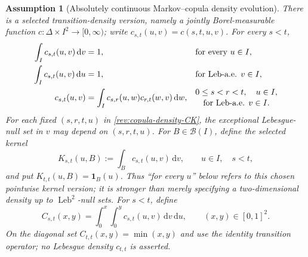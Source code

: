 \documentclass[11pt]{article}
\newtheorem{assumption}[definition]{Assumption}
\theoremstyle{remark}
\newcommand{\dd}{\,\mathrm d}
\newcommand{\one}{\mathbf 1}
\newcommand{\Leb}{\operatorname{Leb}}
\begin{document}
\begin{assumption}[Absolutely continuous Markov--copula density evolution]
\label{rev:ass-copula-density}
There is a \emph{selected transition-density version}, namely a jointly
Borel-measurable function
$c:\Delta\times I^2\to[0,\infty)$; write
$c_{s,t}(u,v)=c(s,t,u,v)$.  For every $s<t$,
\begin{align}
\int_I c_{s,t}(u,v)\dd v&=1,
&&\text{for every }u\in I,\notag\\
\int_I c_{s,t}(u,v)\dd u&=1,
&&\text{for $\Leb$-a.e. }v\in I,
\label{rev:copula-density-margins}\\
c_{s,t}(u,v)&=\int_Ic_{s,r}(u,w)c_{r,t}(w,v)\dd w,
&&\begin{gathered}
0\le s<r<t,\quad u\in I,\\[-2pt]
\text{for $\Leb$-a.e. }v\in I.
\end{gathered}
\label{rev:copula-density-CK}
\end{align}
For each fixed $(s,r,t,u)$ in \eqref{rev:copula-density-CK}, the exceptional
Lebesgue-null set in $v$ may depend on $(s,r,t,u)$.  For $B\in\mathcal B(I)$,
define the selected kernel
\begin{equation}
K_{s,t}(u,B):=\int_Bc_{s,t}(u,v)\dd v,
\qquad u\in I,\quad s<t,
\label{rev:selected-copula-kernel}
\end{equation}
and put $K_{t,t}(u,B)=\one_B(u)$.  Thus ``for every $u$'' below refers to this
chosen pointwise kernel version; it is stronger than merely specifying a
two-dimensional density up to $\Leb^2$-null sets.
For $s<t$, define
\begin{equation}
C_{s,t}(x,y)=\int_0^x\int_0^y c_{s,t}(u,v)\dd v\dd u,
\qquad (x,y)\in[0,1]^2.
\label{rev:copula-from-density}
\end{equation}
On the diagonal set $C_{t,t}(x,y)=\min(x,y)$ and use the identity transition
operator; no Lebesgue density $c_{t,t}$ is asserted.
\end{assumption}
\end{document}
